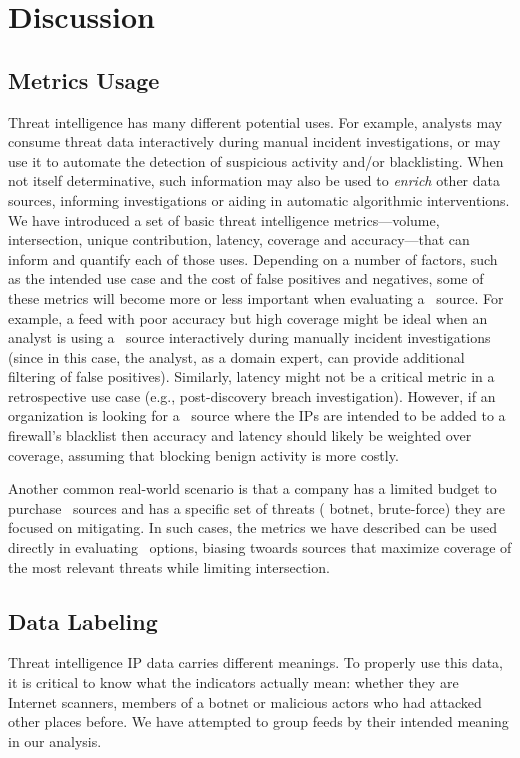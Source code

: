 \section{Discussion}
\label{sec:discussion}

\subsection{Metrics Usage}
Threat intelligence has many different potential uses. For example,
analysts may consume threat data interactively during manual
incident investigations, or may use it to automate the detection of
suspicious activity and/or blacklisting.  When not itself
determinative, such information may also be used to \emph{enrich}
other data sources, informing investigations or aiding in automatic
algorithmic interventions. We have introduced a set of basic threat
intelligence metrics---volume, intersection, unique contribution,
latency, coverage and accuracy---that can inform and quantify each of
those uses.  Depending on a number of factors, such as the intended
use case and the cost of false positives and negatives, some of
these metrics will become more or less important when evaluating a
\ti\ source. For example, a feed with poor accuracy but
high coverage might be ideal when an analyst is using a \ti\ source
interactively during manually incident investigations (since in this
case, the analyst, as a domain expert, can provide additional filtering
of false positives). Similarly, latency might not be a critical metric
in a retrospective use case (e.g., post-discovery breach
investigation).  However, if an organization is looking for a
\ti\ source where the IPs are intended to be added to a firewall's
blacklist then accuracy and latency should likely be weighted over
coverage, assuming that blocking benign activity is more costly.

Another common real-world scenario is that a company has a limited
budget to purchase \ti\ sources and has a specific set of threats (\ie
botnet, brute-force) they are focused on mitigating. In such cases,
the metrics we have described can be used directly in evaluating \ti\
options, biasing twoards sources that maximize coverage of the most
relevant threats while limiting intersection.


\subsection{Data Labeling}
Threat intelligence IP data carries different meanings. To properly use this
data, it is critical to know what the indicators actually mean: whether
they are Internet scanners, members of a botnet or malicious actors who
had attacked other places before. We have attempted to group feeds by their
intended meaning in our analysis.


